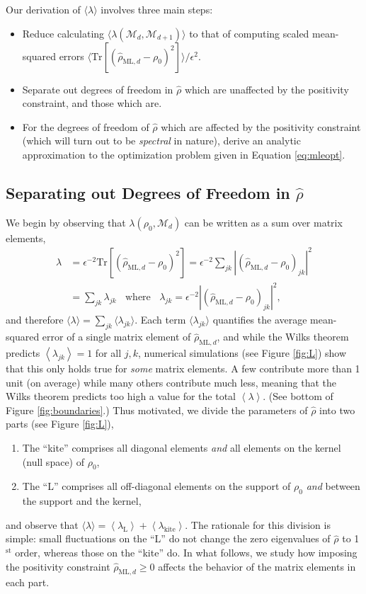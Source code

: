 \documentclass[aps,pra, twocolumn]{revtex4-1}
\newcommand{\M}{\mathcal{M}}
\newcommand{\expect}[1]{\ensuremath{\left\langle#1\right\rangle}}
\newcommand{\rhohat}{\hat{\rho}}
\newcommand{\rhoML}[1]{\rhohat_{\scriptscriptstyle{\mathrm{ML},#1}}}
\begin{document}
Our derivation of $\langle \lambda \rangle$ involves three main steps:
\begin{itemize}
\item Reduce calculating $\langle \lambda(\M_{d}, \M_{d+1})\rangle$ to that of computing scaled mean-squared errors $\langle \mathrm{Tr}[(\rhoML{d} - \rho_{0})^{2}]\rangle/\epsilon^{2}$.
\item Separate out degrees of freedom in $\rhohat$ which are unaffected by the positivity constraint, and those which are.
\item For the degrees of freedom of $\rhohat$ which are affected by the positivity constraint (which will turn out to be \emph{spectral} in nature), derive an analytic approximation to the optimization problem given in Equation \eqref{eq:mleopt}.
\end{itemize}



\subsection{Separating out Degrees of Freedom in $\rhohat$}

We begin by observing that $\lambda(\rho_{0}, \M_{d})$ can be written as a sum over matrix elements,
\begin{align}
\label{eq:llrserrors}
\nonumber \lambda &=\epsilon^{-2}\mathrm{Tr}[(\rhoML{d} - \rho_{0})^{2}] = \epsilon^{-2}\sum_{jk}|(\rhoML{d}- \rho_{0} )_{jk}|^{2}\\
&= \sum_{jk}\lambda_{jk}~~~~\text{where}~~~~\lambda_{jk} = \epsilon^{-2}|(\rhoML{d} - \rho_{0} )_{jk} |^{2},
\end{align}
and therefore $\langle \lambda \rangle = \sum_{jk}\langle\lambda_{jk}\rangle$.  Each term $\langle \lambda_{jk}\rangle$ quantifies the average mean-squared error of a single matrix element of $\rhoML{d}$, and while the Wilks theorem predicts $\expect{\lambda_{jk}}=1$ for all $j,k$, numerical simulations (see Figure \ref{fig:L}) show that this only holds true for \emph{some} matrix elements.  A few contribute more than 1 unit (on average) while many others contribute much less, meaning that the Wilks theorem predicts too high a value for the total $\expect{\lambda}$.  (See bottom of Figure \ref{fig:boundaries}.) Thus motivated, we divide the parameters of $\rhohat$ into two parts (see Figure \ref{fig:L}),
\begin{enumerate}[noitemsep]
\item The ``kite'' comprises all diagonal elements \emph{and} all elements on the kernel (null space) of $\rho_0$,
\item The ``L'' comprises all off-diagonal elements on the support of $\rho_0$ \emph{and} between the support and the kernel,
\end{enumerate}
and observe that $\langle\lambda\rangle = \expect{\lambda_{\mathrm{L}}} + \expect{\lambda_{\mathrm{kite}}}$.  The rationale for this division is simple:  small fluctuations on the ``L'' do not change the zero eigenvalues of $\hat\rho$ to 1$^{\mathrm{st}}$ order, whereas those on the ``kite'' do. In what follows, we study how imposing the positivity constraint $\rhoML{d} \geq 0$ affects the behavior of the matrix elements in each part.
\end{document}
